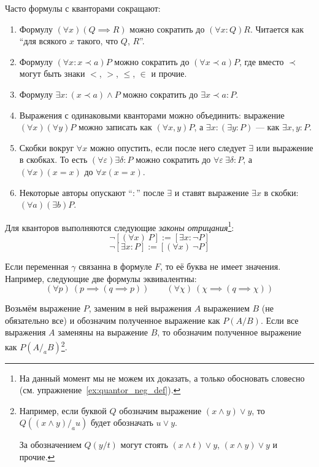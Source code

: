 Часто формулы с кванторами сокращают:
\begin{enumerate}
	\item{}Формулу ${(\forall x)(Q\implies R)}$ можно сократить
	до ${(\forall x:Q)R}$. Читается как ``для всякого $x$ такого, что
	$Q$, $R$''.

	\item{}Формулу $(\forall x:x\prec a)P$ можно сократить до $(\forall x\prec a)P$,
	где вместо $\prec$ могут быть знаки $<$, $>$, $\leq$, $\in$ и прочие.

	\item{}Формулу $\exists x:(x\prec a)\land P$ можно сократить
	до $\exists x\prec a:P$.

	\item{}Выражения с одинаковыми кванторами можно объединить:
	выражение $(\forall x)(\forall y)P$ можно записать как $(\forall x,y)P$,
	а ${\exists x:(\exists y:P)}$ --- как $\exists x,y:P$.

	\item{}Скобки вокруг $\forall x$ можно опустить, если после него следует $\exists$ или
	выражение в скобках.
	То есть ${(\forall \varepsilon)\exists \delta:P}$
	можно сократить до $\forall \varepsilon~\exists \delta:P$,
	а $(\forall x)(x=x)$ до $\forall x(x=x)$.

	\item{}Некоторые авторы опускают ``$:$'' после $\exists$ и
	ставят выражение $\exists x$ в скобки: $(\forall a)(\exists b)P$.
\end{enumerate}

\pagebreak

Для кванторов выполняются следующие {\it законы отрицания}\footnote{
	На данный момент мы не можем их доказать, а только
	обосновать словесно (см. упражнение~\ref{ex:quantor_neg_def}).
}:
\[
	\lnot[(\forall x)~P]:=[\exists x:\lnot P]
\]
\[
	\lnot[\exists x:P]:=[(\forall x)~\lnot P]
\]

Если переменная $\gamma$ связанна в формуле $F$, то её буква не имеет значения.
Например, следующие две формулы эквивалентны:
\[
	(\forall p)~(p\implies (q\implies p))\qquad
	(\forall \chi)~(\chi\implies (q\implies\chi))
\]

Возьмём выражение $P$, заменим в ней выражения $A$ выражением $B$ (не обязательно все)
и обозначим полученное выражение как $P(A/B)$. Если все выражения $A$ заменяны
на выражение $B$, то обозначим полученное выражение как $P(A/_{a}B)$\footnote{
Например, если буквой $Q$ обозначим выражение $(x\land y)\lor y$,
то $Q((x\land y)/_{a}u)$ будет обозначать $u\lor y$.

За обозначением $Q(y/t)$ могут стоять
$(x\land t)\lor y$, $(x\land y)\lor y$ и прочие.
}.

